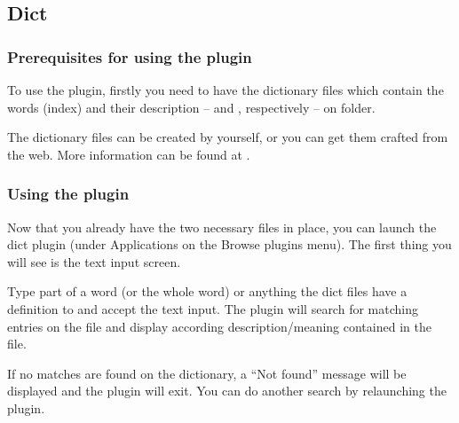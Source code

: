\subsection{Dict}

\subsubsection{Prerequisites for using the plugin}
To use the plugin, firstly you need to have the dictionary files which contain
the words (index) and their description --  and
, respectively -- on  folder.

The dictionary files can be created by yourself, or you can get them crafted
from the web. More information can be found at .

\subsubsection{Using the plugin}
Now that you already have the two necessary files in place, you can launch the
dict plugin (under Applications on the Browse plugins menu). The first thing
you will see is the text input screen.

Type part of a word (or the whole word) or anything the dict files have a
definition to and accept the text input. The plugin will search for matching
entries on the  file and display according description/meaning
contained in the  file.

If no matches are found on the dictionary, a ``Not found'' message will be
displayed and the plugin will exit. You can do another search by relaunching
the plugin.
